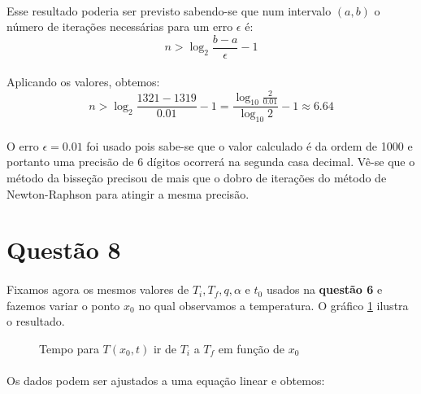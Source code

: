 \documentclass[a4paper,11pt]{article}
\begin{document}
\paragraph{}Esse resultado poderia ser previsto sabendo-se que num intervalo $(a,b)$ o número de iterações necessárias para um erro $\epsilon$ é:
\begin{displaymath}
	n > \log _2 \frac{b - a}{\epsilon} - 1
\end{displaymath}
\paragraph{}Aplicando os valores, obtemos:
\begin{displaymath}
	n > \log _2 \frac{1321 - 1319}{0.01} - 1 = \frac{\log _{10} \frac{2}{0.01}}{\log _{10} 2} - 1 \approx 6.64
\end{displaymath}

\paragraph{}O erro $\epsilon = 0.01$ foi usado pois sabe-se que o valor calculado é da ordem de 1000 e portanto uma precisão de 6 dígitos ocorrerá na segunda casa decimal. Vê-se que o método da bisseção precisou de mais que o dobro de iterações do método de Newton-Raphson para atingir a mesma precisão.

\section*{Questão 8}
\paragraph{} Fixamos agora os mesmos valores de $T_i, T_f, q, \alpha$ e $t_0$ usados na \textbf{questão 6} e fazemos variar o ponto $x_0$ no qual observamos a temperatura. O gráfico \ref{graph:8-1} ilustra o resultado.
\FloatBarrier
\begin{figure}[!htp]
	
	\centering
	\caption{Tempo para $T(x_0, t)$ ir de $T_i$ a $T_f$ em função de $x_0$}
	\label{graph:8-1}
	\end{figure} 
\FloatBarrier
\paragraph{}Os dados podem ser ajustados a uma equação linear e obtemos:
\begin{equation}
	
\end{equation}
\end{document}

